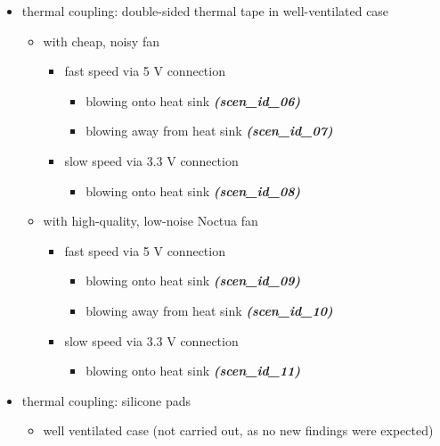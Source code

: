 \documentclass[10pt,parskip=half,
toc=sectionentrywithdots,
bibliography=totocnumbered,
captions=tableheading,numbers=noendperiod]{scrartcl}
\providecommand{\tightlist}{%
  \setlength{\itemsep}{0pt}\setlength{\parskip}{0pt}}
\begin{document}
\begin{itemize}
\tightlist
\item
  thermal coupling: double-sided thermal tape in well-ventilated case

  \begin{itemize}
  \tightlist
  \item
    with cheap, noisy fan

    \begin{itemize}
    \tightlist
    \item
      fast speed via 5 V connection

      \begin{itemize}
      \tightlist
      \item
        blowing onto heat sink \textbf{\emph{(scen\_id\_06)}}
      \item
        blowing away from heat sink \textbf{\emph{(scen\_id\_07)}}
      \end{itemize}
    \item
      slow speed via 3.3 V connection

      \begin{itemize}
      \tightlist
      \item
        blowing onto heat sink \textbf{\emph{(scen\_id\_08)}}
      \end{itemize}
    \end{itemize}
  \item
    with high-quality, low-noise Noctua fan

    \begin{itemize}
    \tightlist
    \item
      fast speed via 5 V connection

      \begin{itemize}
      \tightlist
      \item
        blowing onto heat sink \textbf{\emph{(scen\_id\_09)}}
      \item
        blowing away from heat sink \textbf{\emph{(scen\_id\_10)}}
      \end{itemize}
    \item
      slow speed via 3.3 V connection

      \begin{itemize}
      \tightlist
      \item
        blowing onto heat sink \textbf{\emph{(scen\_id\_11)}}
      \end{itemize}
    \end{itemize}
  \end{itemize}
\item
  thermal coupling: silicone pads

  \begin{itemize}
  \tightlist
  \item
    well ventilated case (not carried out, as no new findings were
    expected)
  \end{itemize}
\end{itemize}
\end{document}
